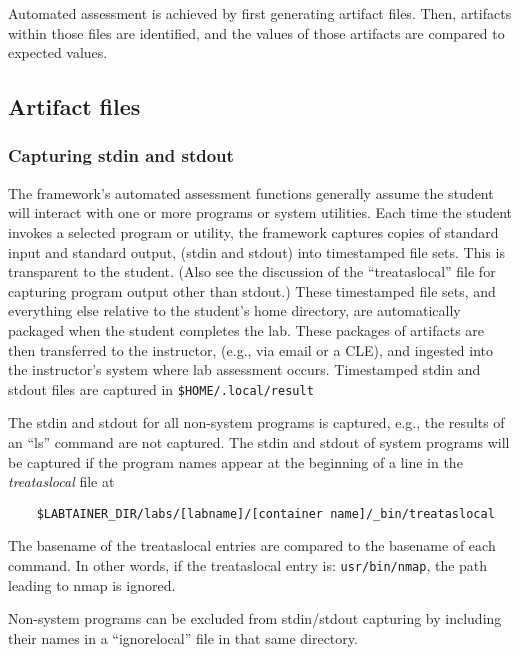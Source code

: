 \documentclass[12pt]{article}
\begin{document}
Automated assessment is achieved by first generating artifact files. Then, artifacts
within those files are identified, and the values of those artifacts are compared to expected values.
\subsection{Artifact files}
\subsubsection{Capturing stdin and stdout}
The framework's automated assessment functions generally assume the student will interact with one or
more programs or system utilities.  Each time the student invokes a selected program or utility, the 
framework captures copies of standard input and standard output, (stdin and stdout) into timestamped file sets.
This is transparent to the student.  (Also see the discussion of the ``treataslocal'' file for capturing
program output other than stdout.)  These timestamped file sets, and everything else relative to
the student's home directory, are automatically packaged when the student completes the lab.
These packages of artifacts are then transferred to the instructor, (e.g., via email or a CLE), and 
ingested into the instructor's system where lab assessment occurs. Timestamped stdin and stdout files
are captured in \texttt{\$HOME/.local/result}

The stdin and stdout for all non-system programs is captured, e.g., the results of an ``ls'' command
are not captured.  The stdin and stdout of system programs will be captured if the program
names appear at the beginning of a line in the \textit{treataslocal} file at
\begin{verbatim}
    $LABTAINER_DIR/labs/[labname]/[container name]/_bin/treataslocal
\end{verbatim}
\noindent The basename of the treataslocal entries are compared to the basename of each command.
In other words, if the treataslocal entry is: \texttt{usr/bin/nmap}, the path leading to nmap is ignored.

Non-system programs can be excluded from stdin/stdout capturing by including their names in
a ``ignorelocal'' file in that same directory.
\end{document}
